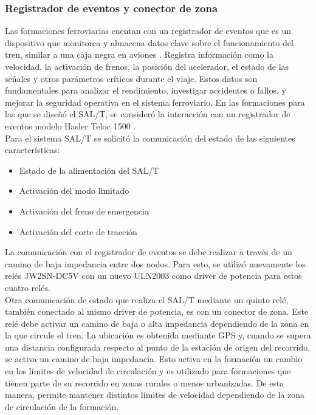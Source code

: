 \subsubsection{Registrador de eventos y conector de zona}

Las formaciones ferroviarias cuentan con un registrador de eventos que es un dispositivo que monitorea y almacena datos clave sobre el funcionamiento del tren, similar a una caja negra en aviones \cite{registrador_eventos}. Registra información como la velocidad, la activación de frenos, la posición del acelerador, el estado de las señales y otros parámetros críticos durante el viaje. Estos datos son fundamentales para analizar el rendimiento, investigar accidentes o fallos, y mejorar la seguridad operativa en el sistema ferroviario. En las formaciones para las que se diseñó el SAL/T, se consideró la interacción con un registrador de eventos modelo Hasler Teloc 1500 \cite{hasler}. \\ 

Para el sistema SAL/T se solicitó la comunicación del estado de las siguientes características: 

\begin{itemize}    
    \item Estado de la alimentación del SAL/T
    \item Activación del modo limitado
    \item Activación del freno de emergencia
    \item Activación del corte de tracción
\end{itemize}

La comunicación con el registrador de eventos se debe realizar a través de un camino de baja impedancia entre dos nodos. Para esto, se utilizó nuevamente los relés JW2SN-DC5V con un nuevo ULN2003 como driver de potencia para estos cuatro relés. \\

Otra comunicación de estado que realiza el SAL/T mediante un quinto relé, también conectado al mismo driver de potencia, es con un conector de zona. Este relé debe activar un camino de baja o alta impedancia dependiendo de la zona en la que circule el tren. La ubicación es obtenida mediante GPS y, cuando se supera una distancia configurada respecto al punto de la estación de origen del recorrido, se activa un camino de baja impedancia. Esto activa en la formación un cambio en los límites de velocidad de circulación y es utilizado para formaciones que tienen parte de su recorrido en zonas rurales o menos urbanizadas. De esta manera, permite mantener distintos límites de velocidad dependiendo de la zona de circulación de la formación. 